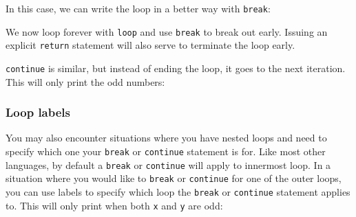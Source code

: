 \documentclass[a4paper,]{book}
\newenvironment{Shaded}{\begin{snugshade}}{\end{snugshade}}
\newcommand{\KeywordTok}[1]{\textcolor[rgb]{0.13,0.29,0.53}{\textbf{{#1}}}}
\newcommand{\DecValTok}[1]{\textcolor[rgb]{0.00,0.00,0.81}{{#1}}}
\newcommand{\StringTok}[1]{\textcolor[rgb]{0.31,0.60,0.02}{{#1}}}
\newcommand{\PreprocessorTok}[1]{\textcolor[rgb]{0.56,0.35,0.01}{\textit{{#1}}}}
\newcommand{\NormalTok}[1]{{#1}}
\begin{document}
In this case, we can write the loop in a better way with \texttt{break}:

\begin{Shaded}
\end{Shaded}

We now loop forever with \texttt{loop} and use \texttt{break} to break
out early. Issuing an explicit \texttt{return} statement will also serve
to terminate the loop early.

\texttt{continue} is similar, but instead of ending the loop, it goes to
the next iteration. This will only print the odd numbers:

\begin{Shaded}
\end{Shaded}

\subsubsection{Loop labels}\label{loop-labels}

You may also encounter situations where you have nested loops and need
to specify which one your \texttt{break} or \texttt{continue} statement
is for. Like most other languages, by default a \texttt{break} or
\texttt{continue} will apply to innermost loop. In a situation where you
would like to \texttt{break} or \texttt{continue} for one of the outer
loops, you can use labels to specify which loop the \texttt{break} or
\texttt{continue} statement applies to. This will only print when both
\texttt{x} and \texttt{y} are odd:
\end{document}
